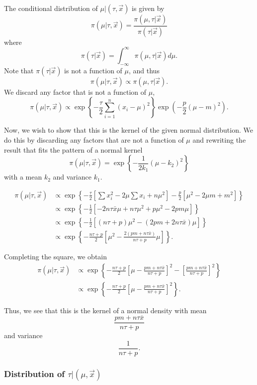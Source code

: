 \documentclass[
  11pt,
]{paper}
\begin{document}
The conditional distribution of \(\mu|(\tau,\vec{x})\) is given by \[
  \pi(\mu | \tau,\vec{x}) = \frac{\pi(\mu,\tau|\vec{x})}{\pi(\tau|\vec{x})}
\] where \[
  \pi(\tau|\vec{x}) = \int_{-\infty}^{\infty} \pi(\mu,\tau|\vec{x}) d\mu.
\] Note that \(\pi(\tau|\vec{x})\) is not a function of \(\mu\), and
thus \[
  \pi(\mu | \tau,\vec{x}) \propto \pi(\mu,\tau|\vec{x}).
\] We discard any factor that is not a function of \(\mu\), \[
  \pi(\mu | \tau,\vec{x}) \propto \exp\left\{-\frac{\tau}{2}\sum_{i=1}^{n}(x_i-\mu)^2\right\} \exp\left(-\frac{p}{2}(\mu - m)^2\right).
\]

Now, we wish to show that this is the kernel of the given normal
distribution. We do this by discarding any factors that are not a
function of \(\mu\) and rewriting the result that fits the pattern of a
normal kernel \[
  \pi(\mu | \tau,\vec{x}) = \exp\left\{-\frac{1}{2 k_1}\left(\mu - k_2\right)^2\right\}
\] with a mean \(k_2\) and variance \(k_1\).

\begin{align}
  \pi(\mu | \tau,\vec{x})
    &\propto \exp\left\{-\frac{\tau}{2}\left[\sum x_i^2 - 2 \mu \sum x_i + n \mu^2\right] - \frac{p}{2}\left[\mu^2 - 2\mu m + m^2\right]\right\}\\
    &\propto \exp\left\{-\frac{1}{2}\left[- 2 n \tau \bar{x}\mu + n \tau \mu^2 + p \mu^2 - 2 p m \mu\right]\right\}\\
    &\propto \exp\left\{-\frac{1}{2}\left[(n \tau + p)\mu^2 - (2 p m + 2 n \tau \bar{x})\mu\right]\right\}\\
    &\propto \exp\left\{-\frac{n \tau + p}{2}\left[\mu^2 - \frac{2(p m + n \tau \bar{x})}{n \tau + p}\mu\right]\right\}.
\end{align}

Completing the square, we obtain \begin{align}
  \pi(\mu | \tau,\vec{x})
    &\propto \exp\left\{-\frac{n \tau + p}{2}\left[\mu - \frac{p m + n \tau \bar{x}}{n \tau + p}\right]^2 - \left[\frac{p m + n \tau \bar{x}}{n \tau + p}\right]^2\right\}\\
    &\propto \exp\left\{-\frac{n \tau + p}{2}\left[\mu - \frac{p m + n \tau \bar{x}}{n \tau + p}\right]^2\right\}.
\end{align}

Thus, we see that this is the kernel of a normal density with mean \[
  \frac{p m + n \tau \bar{x}}{n \tau + p}
\] and variance \[
  \frac{1}{n\tau + p}.
\]

\hypertarget{distribution-of-taumuvecx}{%
\subsubsection{\texorpdfstring{Distribution of
\(\tau|(\mu,\vec{x})\)}{Distribution of \textbackslash tau\textbar(\textbackslash mu,\textbackslash vec\{x\})}}\label{distribution-of-taumuvecx}}
\end{document}

